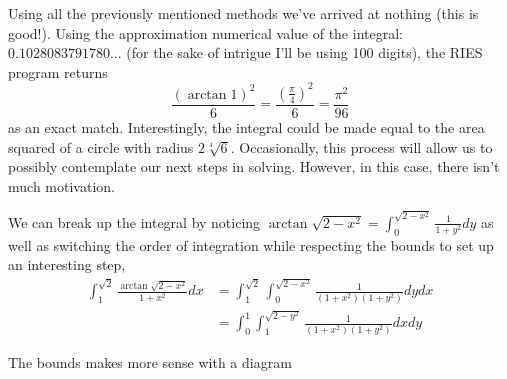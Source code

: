 \documentclass{article}
\begin{document}
Using all the previously mentioned methods we've arrived at nothing (this is good!). Using the approximation numerical value of the integral: $0.1028083791780...$ (for the sake of intrigue I'll be using 100 digits), the RIES program returns
$$
\frac{(\arctan{1})^2}{6} = \frac{\left( \frac{\pi}{4} \right)^2}{6} = \frac{\pi^2}{96}
$$
as an exact match. Interestingly, the integral could be made equal to the area squared of a circle with radius $2\sqrt[4]{6}$. Occasionally, this process will allow us to possibly contemplate our next steps in solving. However, in this case, there isn't much motivation.

We can break up the integral by noticing $\arctan{\sqrt{2-x^2}} = \int_{0}^{\sqrt{2-x^2}}{\frac{1}{1+y^2}}dy$ as well as switching the order of integration while respecting the bounds to set up an interesting step,
\begin{align*}
\int_{1}^{\sqrt{2}}{\frac{\arctan{\sqrt{2 - x^2}}}{1+x^2}dx} &= \int_{1}^{\sqrt{2}}{\int_{0}^{\sqrt{2-x^2}}{\frac{1}{(1+x^2)(1+y^2)}dy}dx}\\ &= \int_{0}^{1}{\int_{1}^{\sqrt{2-y^2}}{\frac{1}{(1+x^2)(1+y^2)}dx}dy}
\end{align*}

The bounds makes more sense with a diagram
\end{document}
